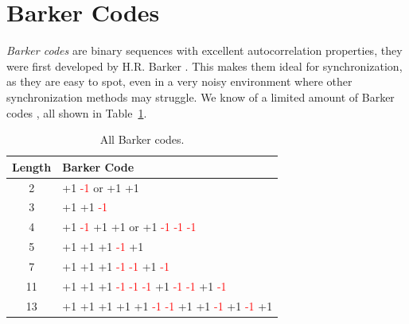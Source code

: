 \section{Barker Codes}
\textit{Barker codes} are binary sequences with excellent autocorrelation properties, they were first developed by H.R. Barker \cite{barker1953group}. This makes them ideal for synchronization, as they are easy to spot, even in a very noisy environment where other synchronization methods may struggle. We know of a limited amount of Barker codes \cite{Coxson2008}, all shown in Table~\ref{tab:barker_codes}.
\begin{table}[h]
    \label{tab:barker_codes}
    \centering
    \renewcommand{\arraystretch}{1.3}
    \begin{tabular}{|c|l|}
        \hline
        \textbf{Length} & \textbf{Barker Code} \\ 
        \hline
        2 & \textcolor{green!50!black}{+1} \textcolor{red}{-1} \quad or \quad \textcolor{green!50!black}{+1} \textcolor{green!50!black}{+1} \\ 
        \hline
        3 & \textcolor{green!50!black}{+1} \textcolor{green!50!black}{+1} \textcolor{red}{-1} \\ 
        \hline
        4 & \textcolor{green!50!black}{+1} \textcolor{red}{-1} \textcolor{green!50!black}{+1} \textcolor{green!50!black}{+1} \quad or \quad \textcolor{green!50!black}{+1} \textcolor{red}{-1} \textcolor{red}{-1} \textcolor{red}{-1} \\ 
        \hline
        5 & \textcolor{green!50!black}{+1} \textcolor{green!50!black}{+1} \textcolor{green!50!black}{+1} \textcolor{red}{-1} \textcolor{green!50!black}{+1} \\ 
        \hline
        7 & \textcolor{green!50!black}{+1} \textcolor{green!50!black}{+1} \textcolor{green!50!black}{+1} \textcolor{red}{-1} \textcolor{red}{-1} \textcolor{green!50!black}{+1} \textcolor{red}{-1} \\ 
        \hline
        11 & \textcolor{green!50!black}{+1} \textcolor{green!50!black}{+1} \textcolor{green!50!black}{+1} \textcolor{red}{-1} \textcolor{red}{-1} \textcolor{red}{-1} \textcolor{green!50!black}{+1} \textcolor{red}{-1} \textcolor{red}{-1} \textcolor{green!50!black}{+1} \textcolor{red}{-1} \\ 
        \hline
        13 & \textcolor{green!50!black}{+1} \textcolor{green!50!black}{+1} \textcolor{green!50!black}{+1} \textcolor{green!50!black}{+1} \textcolor{green!50!black}{+1} \textcolor{red}{-1} \textcolor{red}{-1} \textcolor{green!50!black}{+1} \textcolor{green!50!black}{+1} \textcolor{red}{-1} \textcolor{green!50!black}{+1} \textcolor{red}{-1} \textcolor{green!50!black}{+1} \\ 
        \hline
    \end{tabular}
    \caption{All Barker codes.}
    \label{tab:barker_codes}
\end{table}
